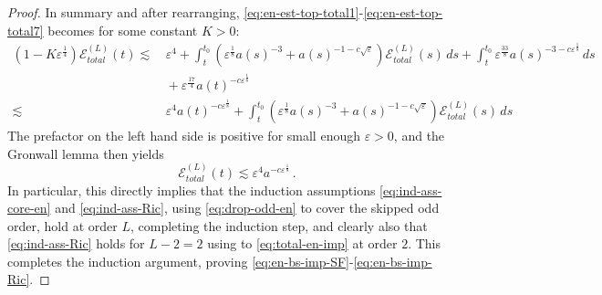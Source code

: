 \documentclass[11pt,leqno,textwidth=10cm]{amsart}
\numberwithin{equation}{section}
\theoremstyle{definition}
\theoremstyle{plain}
\newcommand{\1}{\mathbbm{1}}
\newcommand{\E}{\mathcal{E}}
\renewcommand{\epsilon}{\varepsilon}
\newcommand{\Lap}{\Delta}
\begin{document}
{\begin{proof}
\noindent In summary and after rearranging, \eqref{eq:en-est-top-total1}-\eqref{eq:en-est-top-total7} becomes for some constant $K>0$:
\begin{align*}
(1-K\epsilon^\frac14)\E_{total}^{(L)}(t)\lesssim&\,\epsilon^4+\int_t^{t_0}\left(\epsilon^\frac18a(s)^{-3}+a(s)^{-1-c\sqrt{\epsilon}}\right)\E_{total}^{(L)}(s)\,ds+\int_t^{t_0}\epsilon^\frac{33}8a(s)^{-3-c\epsilon^\frac18}\,ds\\
&\,+\epsilon^\frac{17}4a(t)^{-c\epsilon^\frac18}\\
\lesssim&\,\epsilon^4a(t)^{-c\epsilon^\frac18}+\int_t^{t_0}\left(\epsilon^\frac18a(s)^{-3}+a(s)^{-1-c\sqrt{\epsilon}}\right)\E_{total}^{(L)}(s)\,ds\,
\end{align*} 
The prefactor on the left hand side is positive for small enough $\epsilon>0$, and the Gronwall lemma then yields
\begin{equation}\label{eq:total-en-imp}
\E^{(L)}_{total}(t)\lesssim \epsilon^4a^{-c\epsilon^\frac18}\,.
\end{equation}
In particular, this directly implies that the induction assumptions \eqref{eq:ind-ass-core-en} and \eqref{eq:ind-ass-Ric}, using \eqref{eq:drop-odd-en} to cover the skipped odd order, hold at order $L$, completing the induction step, and clearly also that \eqref{eq:ind-ass-Ric} holds for $L-2=2$ using to \eqref{eq:total-en-imp} at order $2$. This completes the induction argument, proving \eqref{eq:en-bs-imp-SF}-\eqref{eq:en-bs-imp-Ric}.

\end{proof}}
\end{document}
